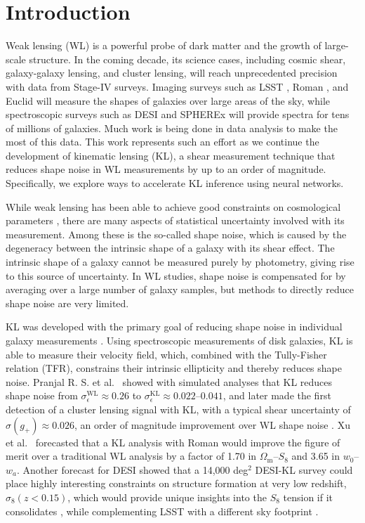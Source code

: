 \section{Introduction}
\label{sec:intro}

Weak lensing (WL) is a powerful probe of dark matter and the growth of large-scale structure. In the coming decade, its science cases, including cosmic shear, galaxy-galaxy lensing, and cluster lensing, will reach unprecedented precision with data from Stage-IV surveys. Imaging surveys such as LSST \citep{DESC_SRD}, Roman \citep{Roman_AFTA,HLIS-Multiprobe,HLIS-LSST}, and Euclid \citep{Euclid} will measure the shapes of galaxies over large areas of the sky, while spectroscopic surveys such as DESI \citep{DESI1,DESI2} and SPHEREx \citep{spherex} will provide spectra for tens of millions of galaxies. Much work is being done in data analysis to make the most of this data. This work represents such an effort as we continue the development of kinematic lensing (KL), a shear measurement technique that reduces shape noise in WL measurements by up to an order of magnitude. Specifically, we explore ways to accelerate KL inference using neural networks.

While weak lensing has been able to achieve good constraints on cosmological parameters \citep{DES_Y3_3x2pt, DESY6CS}, there are many aspects of statistical uncertainty involved with its measurement. Among these is the so-called shape noise, which is caused by the degeneracy between the intrinsic shape of a galaxy with its shear effect. The intrinsic shape of a galaxy cannot be measured purely by photometry, giving rise to this source of uncertainty. In WL studies, shape noise is compensated for by averaging over a large number of galaxy samples, but methods to directly reduce shape noise are very limited.

KL was developed with the primary goal of reducing shape noise in individual galaxy measurements \citep{KL}. Using spectroscopic measurements of disk galaxies, KL is able to measure their velocity field, which, combined with the Tully-Fisher relation (TFR), constrains their intrinsic ellipticity and thereby reduces shape noise. Pranjal R. S. et al.~\citep{KLInferenceI} showed with simulated analyses that KL reduces shape noise from $\sigma_\epsilon^\mathrm{WL}\approx0.26$ to $\sigma_\epsilon^\mathrm{KL}\approx0.022$--$0.041$, and later made the first detection of a cluster lensing signal with KL, with a typical shear uncertainty of $\sigma(g_+)\approx0.026$, an order of magnitude improvement over WL shape noise \citep{KLCluster}. Xu et al.~\citep{KLRoman} forecasted that a KL analysis with Roman would improve the figure of merit over a traditional WL analysis by a factor of 1.70 in $\Omega_\mathrm{m}$--$S_8$ and 3.65 in $w_0$--$w_a$. Another forecast for DESI showed that a 14,000 deg$^2$ DESI-KL survey could place highly interesting constraints on structure formation at very low redshift, $\sigma_8(z<0.15)$, which would provide unique insights into the $S_8$ tension if it consolidates , while complementing LSST with a different sky footprint \citep{KLDESI}.

